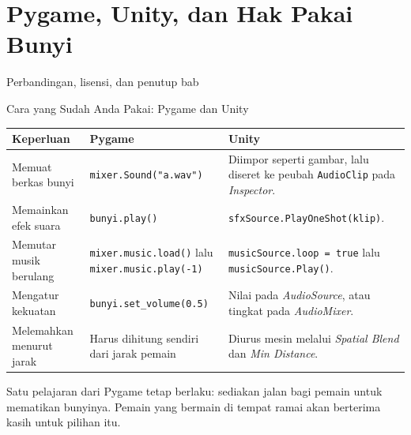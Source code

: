 \documentclass[aspectratio=169,10pt]{beamer}
\begin{document}
\section{Pygame, Unity, dan Hak Pakai Bunyi}
  {Perbandingan, lisensi, dan penutup bab}

\begin{frame}{Cara yang Sudah Anda Pakai: Pygame dan Unity}
{\scriptsize
\renewcommand{\arraystretch}{1.12}
\begin{tabularx}{\textwidth}{@{}>{\raggedright\arraybackslash}p{3.2cm}
    >{\raggedright\arraybackslash}p{4.9cm}
    >{\raggedright\arraybackslash}X@{}}
\toprule
\textbf{Keperluan} & \textbf{Pygame} & \textbf{Unity} \\
\midrule
Memuat berkas bunyi & \texttt{mixer.Sound("a.wav")} &
  Diimpor seperti gambar, lalu diseret ke peubah \texttt{AudioClip} pada
  \emph{Inspector}. \\
\addlinespace
Memainkan efek suara & \texttt{bunyi.play()} &
  \texttt{sfxSource.PlayOneShot(klip)}. \\
\addlinespace
Memutar musik berulang & \texttt{mixer.music.load()} lalu
  \texttt{mixer.music.play(-1)} &
  \texttt{musicSource.loop = true} lalu \texttt{musicSource.Play()}. \\
\addlinespace
Mengatur kekuatan & \texttt{bunyi.set\_volume(0.5)} &
  Nilai pada \emph{AudioSource}, atau tingkat pada \emph{AudioMixer}. \\
\addlinespace
Melemahkan menurut jarak & Harus dihitung sendiri dari jarak pemain &
  Diurus mesin melalui \emph{Spatial Blend} dan \emph{Min Distance}. \\
\bottomrule
\end{tabularx}}
\vspace{0.14cm}
\begin{kotak}
Satu pelajaran dari Pygame tetap berlaku: sediakan jalan bagi pemain untuk
mematikan bunyinya. Pemain yang bermain di tempat ramai akan berterima kasih
untuk pilihan itu.
\end{kotak}
\end{frame}
\end{document}
